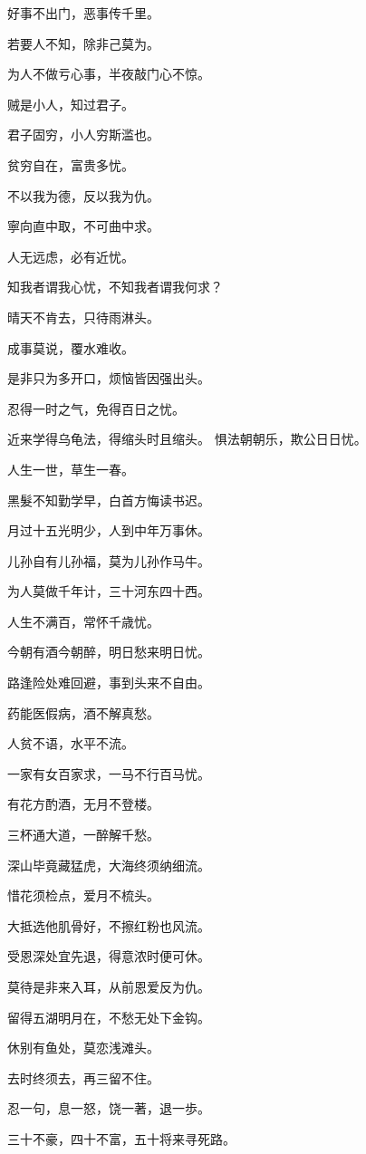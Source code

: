 \documentclass[12pt,oneside]{book}
\begin{document}
好事不出门，恶事传千里。

若要人不知，除非己莫为。

为人不做亏心事，半夜敲门心不惊。

贼是小人，知过君子。

君子固穷，小人穷斯滥也。

贫穷自在，富贵多忧。

不以我为德，反以我为仇。

寧向直中取，不可曲中求。

人无远虑，必有近忧。

知我者谓我心忧，不知我者谓我何求？

晴天不肯去，只待雨淋头。

成事莫说，覆水难收。

是非只为多开口，烦恼皆因强出头。

忍得一时之气，免得百日之忧。

近来学得乌龟法，得缩头时且缩头。
惧法朝朝乐，欺公日日忧。


人生一世，草生一春。

黑髮不知勤学早，白首方悔读书迟。

月过十五光明少，人到中年万事休。

儿孙自有儿孙福，莫为儿孙作马牛。

为人莫做千年计，三十河东四十西。

人生不满百，常怀千歳忧。

今朝有酒今朝醉，明日愁来明日忧。

路逢险处难回避，事到头来不自由。

药能医假病，酒不解真愁。

人贫不语，水平不流。

一家有女百家求，一马不行百马忧。

有花方酌酒，无月不登楼。

三杯通大道，一醉解千愁。

深山毕竟藏猛虎，大海终须纳细流。

惜花须检点，爱月不梳头。

大抵选他肌骨好，不擦红粉也风流。

受恩深处宜先退，得意浓时便可休。

莫待是非来入耳，从前恩爱反为仇。

留得五湖明月在，不愁无处下金钩。

休别有鱼处，莫恋浅滩头。

去时终须去，再三留不住。

忍一句，息一怒，饶一著，退一歩。

三十不豪，四十不富，五十将来寻死路。
\end{document}
